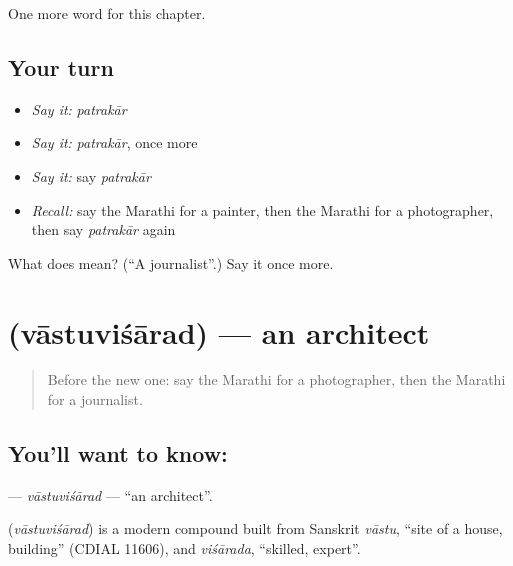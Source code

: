 \begin{grammarlens}[title={What you've built}]
One more word for this chapter.
\end{grammarlens}

\subsection*{Your turn}
\begin{itemize}
\raggedright
  \item \emph{Say it:} \emph{patrakār}
  \item \emph{Say it:} \emph{patrakār}, once more
  \item \emph{Say it:} say \emph{patrakār}
  \item \emph{Recall:} say the Marathi for a painter, then the Marathi for a photographer, then say \emph{patrakār} again
\end{itemize}

\begin{tcolorbox}[breakable,colback=teal!4,colframe=teal!35!black,title={Before you move on}]
What does  mean? (\textquotedblleft{}A journalist\textquotedblright{}.) Say it once more.
\end{tcolorbox}
\section[\texorpdfstring{\mr{वास्तुविशारद} (vāstuviśārad)}{वास्तुविशारद (vāstuviśārad)}]{ (vāstuviśārad) — an architect}

\label{lesson:MR-C180-vastuvisarad}



\begin{quote}
Before the new one: say the Marathi for a photographer, then the Marathi for a journalist.
\end{quote}

\subsection*{You'll want to know: }
\textbf{} — \emph{vāstuviśārad} — \textquotedblleft{}an architect\textquotedblright{}.

\begin{cousinweb}
\textbf{} (\emph{vāstuviśārad}) is a modern compound built from Sanskrit \emph{vāstu}, \textquotedblleft{}site of a house, building\textquotedblright{} (CDIAL 11606), and \emph{viśārada}, \textquotedblleft{}skilled, expert\textquotedblright{}.
\end{cousinweb}

